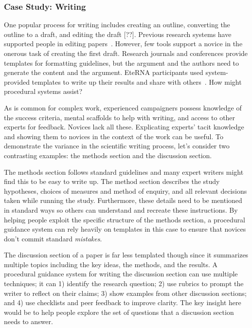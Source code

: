 \subsubsection{Case Study: Writing}
One popular process for writing includes creating an outline, converting the outline to a draft, and editing the draft [??]. Previous research systems have supported people in editing papers~\cite{Bernstein2010a}. However, few tools support a novice in the onerous task of creating the first draft. Research journals and conferences provide templates for formatting guidelines, but the argument and the authors need to generate the content and the argument. EteRNA participants used system-provided templates to write up their results and share with others~\cite{Lee2014}. How might procedural systems assist?

As is common for complex work, experienced campaigners possess knowledge of the success criteria, mental scaffolds to help with writing, and access to other experts for feedback. Novices lack all these. Explicating experts' tacit knowledge and showing them to novices in the context of the work can be useful. To demonstrate the variance in the scientific writing process, let’s consider two contrasting examples: the methods section and the discussion section.

The methods section follows standard guidelines and many expert writers might find this to be easy to write up. The method section describes the study hypotheses, choices of measures and method of enquiry, and all relevant decisions taken while running the study. Furthermore, these details need to be mentioned in standard ways so others can understand and recreate these instructions. By helping people exploit the specific structure of the methods section, a procedural guidance system can rely heavily on templates in this case to ensure that novices don't commit standard \textit{mistakes}. 

The discussion section of a paper is far less templated though since it summarizes multiple topics including the key ideas, the methods, and the results. A procedural guidance system for writing the discussion section can use multiple techniques; it can 1) identify the research question; 2) use rubrics to prompt the writer to reflect on their claims; 3) show examples from other discussion sections; and 4) use checklists and peer feedback to improve clarity. The key insight here would be to help people explore the set of questions that a discussion section needs to answer.

